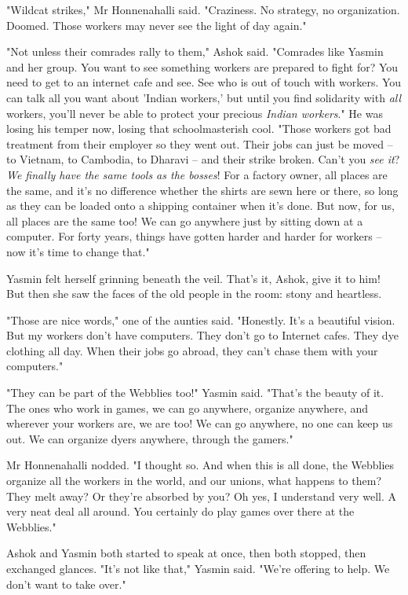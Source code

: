 "Wildcat strikes," Mr Honnenahalli said. "Craziness. No strategy,
no organization. Doomed. Those workers may never see the light of
day again."

"Not unless their comrades rally to them," Ashok said. "Comrades
like Yasmin and her group. You want to see something workers are
prepared to fight for? You need to get to an internet cafe and see.
See who is out of touch with workers. You can talk all you want
about 'Indian workers,' but until you find solidarity with
\emph{all} workers, you'll never be able to protect your precious
\emph{Indian workers}." He was losing his temper now, losing that
schoolmasterish cool. "Those workers got bad treatment from their
employer so they went out. Their jobs can just be moved -- to
Vietnam, to Cambodia, to Dharavi -- and their strike broken. Can't
you \emph{see it}?
\emph{We finally have the same tools as the bosses}! For a factory
owner, all places are the same, and it's no difference whether the
shirts are sewn here or there, so long as they can be loaded onto a
shipping container when it's done. But now, for us, all places are
the same too! We can go anywhere just by sitting down at a
computer. For forty years, things have gotten harder and harder for
workers -- now it's time to change that."

Yasmin felt herself grinning beneath the veil. That's it, Ashok,
give it to him! But then she saw the faces of the old people in the
room: stony and heartless.

"Those are nice words," one of the aunties said. "Honestly. It's a
beautiful vision. But my workers don't have computers. They don't
go to Internet cafes. They dye clothing all day. When their jobs go
abroad, they can't chase them with your computers."

"They can be part of the Webblies too!" Yasmin said. "That's the
beauty of it. The ones who work in games, we can go anywhere,
organize anywhere, and wherever your workers are, we are too! We
can go anywhere, no one can keep us out. We can organize dyers
anywhere, through the gamers."

Mr Honnenahalli nodded. "I thought so. And when this is all done,
the Webblies organize all the workers in the world, and our unions,
what happens to them? They melt away? Or they're absorbed by you?
Oh yes, I understand very well. A very neat deal all around. You
certainly do play games over there at the Webblies."

Ashok and Yasmin both started to speak at once, then both stopped,
then exchanged glances. "It's not like that," Yasmin said. "We're
offering to help. We don't want to take over."

